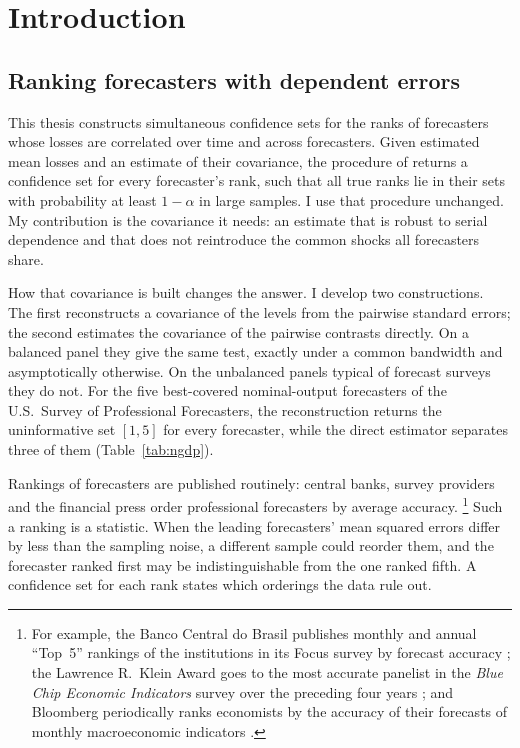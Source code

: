\chapter{Introduction}
\label{ch:intro}

\section{Ranking forecasters with dependent errors}
\label{sec:intro-motivation}

This thesis constructs simultaneous confidence sets for the ranks of forecasters whose
losses are correlated over time and across forecasters. Given estimated mean losses and
an estimate of their covariance, the procedure of \citet{mogstad2024} returns a
confidence set for every forecaster's rank, such that all true ranks lie in their sets
with probability at least $1-\alpha$ in large samples. I use that procedure unchanged. My contribution
is the covariance it needs: an estimate that is robust to serial dependence and that
does not reintroduce the common shocks all forecasters share.

How that covariance is built changes the answer. I develop two constructions. The first
reconstructs a covariance of the levels from the pairwise standard errors; the second
estimates the covariance of the pairwise contrasts directly. On a balanced panel they
give the same test, exactly under a common bandwidth and asymptotically otherwise. On the
unbalanced panels typical of forecast surveys they do not.
For the five best-covered nominal-output forecasters of the U.S.\ Survey of Professional
Forecasters, the reconstruction returns the uninformative set $[1,5]$ for every
forecaster, while the direct estimator separates three of them (Table~\ref{tab:ngdp}).

Rankings of forecasters are published routinely: central banks, survey providers and
the financial press order professional forecasters by average accuracy.%
\footnote{For example, the Banco Central do Brasil publishes monthly and annual ``Top~5''
rankings of the institutions in its Focus survey by forecast accuracy \citep{bcbtop5};
the Lawrence R.~Klein Award goes to the most accurate panelist in the \emph{Blue Chip
Economic Indicators} survey over the preceding four years \citep{bluechipklein2025}; and
Bloomberg periodically ranks economists by the accuracy of their forecasts of monthly
macroeconomic indicators \citep{bloomberg2017}.}
Such a ranking is a statistic. When the leading forecasters' mean squared errors differ
by less than the sampling noise, a different sample could reorder them, and the
forecaster ranked first may be indistinguishable from the one ranked fifth. A confidence
set for each rank states which orderings the data rule out.

